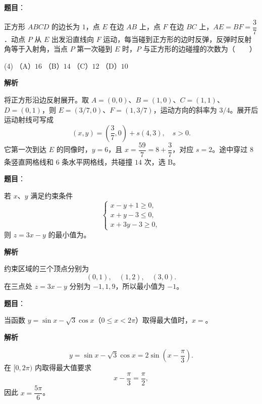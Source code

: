 \begin{answer}

\textbf{题目}：

正方形 $ABCD$ 的边长为 $1$，点 $E$ 在边 $AB$ 上，点 $F$ 在边 $BC$ 上，$AE=BF=\dfrac37$．动点 $P$ 从 $E$ 出发沿直线向 $F$ 运动，每当碰到正方形的边时反弹，反弹时反射角等于入射角，当点 $P$ 第一次碰到 $E$ 时，$P$ 与正方形的边碰撞的次数为\mbox{（　　）}

\begin{gkopts}(4)
\task （A）$16$
\task （B）$14$
\task （C）$12$
\task （D）$10$
\end{gkopts}

\textbf{解析}

将正方形沿边反射展开。取 $A=(0,0)$、$B=(1,0)$、$C=(1,1)$、$D=(0,1)$，则 $E=(3/7,0)$、$F=(1,3/7)$，运动方向的斜率为 $3/4$。展开后运动射线可写成
\nopagebreak[4]
\[
(x,y)=\left(\frac37,0\right)+s(4,3),\quad s>0.
\]
它第一次到达 $E$ 的同像时，$y=6$，且 $x=\dfrac{59}{7}=8+\dfrac37$，对应 $s=2$。途中穿过 $8$ 条竖直网格线和 $6$ 条水平网格线，共碰撞 $14$ 次，选 B。


\end{answer}
\begin{answer}

\textbf{题目}：

若 $x\text{、}y$ 满足约束条件
\nopagebreak[4]
\[
\begin{cases}
x-y+1\geqslant0,\\
x+y-3\leqslant0,\\
x+3y-3\geqslant0,
\end{cases}
\]
则 $z=3x-y$ 的最小值为\gkblank{}。

\textbf{解析}

约束区域的三个顶点分别为
\nopagebreak[4]
\[
(0,1),\quad(1,2),\quad(3,0).
\]
在三点处 $z=3x-y$ 分别为 $-1,1,9$，所以最小值为 $-1$。


\end{answer}
\begin{answer}

\textbf{题目}：

当函数 $y=\sin x-\sqrt3\cos x$（$0\leqslant x<2\pi$）取得最大值时，$x=$\gkblank{}。

\textbf{解析}

\nopagebreak[4]
\[
y=\sin x-\sqrt3\cos x=2\sin\left(x-\frac\pi3\right).
\]
在 $[0,2\pi)$ 内取得最大值要求
\nopagebreak[4]
\[
x-\frac\pi3=\frac\pi2,
\]
因此 $x=\dfrac{5\pi}{6}$。


\end{answer}
